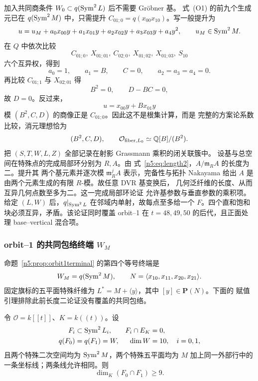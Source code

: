 加入共同商条件 \(W_0\subset q(\operatorname{Sym}^2L)\) 后不需要 Gröbner 基。
式~(O1) 的前九个生成元已在 \(q(\operatorname{Sym}^2M)\) 中，只需提升
\(C_{01;0}=q(x_{00}x_{10})\)。写一般提升为
\[
u=u_M+a_0x_{00}y+a_1x_{01}y+a_2x_{02}y+a_3x_{03}y+a_4y^2,
\qquad u_M\in\operatorname{Sym}^2M .
\]
在 \(Q\) 中依次比较
\[
C_{01;0},\ X_{01;01},\ C_{02;0},\ X_{01;02},\
X_{01;03},\ S_{10}
\]
六个互异权，得到
\[
a_0=1,\qquad a_1=B,\qquad C=0,\qquad
a_2=a_3=a_4=0.
\]
再比较 \(C_{01;1}\) 与 \(X_{02;01}\) 得
\[
B^2=0,\qquad D-BC=0,
\]
故 \(D=0\)。反过来，
\[
u=x_{00}y+Bx_{01}y
\]
模 \((B^2,C,D)\) 的商像正是 \(C_{01;0}\)。因此这不是根集计算，而是
完整的方案论系数比较，消元理想恰为
\begin{equation}\label{n5:eq:length2}
 (B^2,C,D),\qquad
 \mathcal O_{\mathrm{fiber},L_0}\simeq\mathbb Q[B]/(B^2).
\end{equation}
把 \((S,T,W,L,Z)\) 全部记录在射影 Grassmann 乘积的闭关联簇中。
设基与总空间在特殊点的完成局部环分别为 \(R,A\)。由
式~\eqref{n5:eq:length2}，\(A/\mathfrak m_RA\) 的长度为二。提升其
两个基元素并逐次模 \(\mathfrak m_R^jA\) 表示，完备性与拓扑 Nakayama
给出 \(A\) 是由两个元素生成的有限 \(R\)-模。故任意 DVR 基变换后，
几何泛纤维的长度、从而互异几何点数至多为二。这一完成局部环论证
允许基参数与垂直参数的乘积项。
给定 \((L,W)\) 后，\(q|_{\operatorname{Sym}^2L}\) 在邻域内单射，故每点至多给一个
\(F\)。四个直和饱和块必须互异，矛盾。该论证同时覆盖 orbit--1 在
\(t=48,49,50\) 的后代，且正面处理 base--vertical 混合项。

\subsubsection{orbit--1 的共同包络终端 \(W_M\)}

命题~\ref{n5:prop:orbit1terminal} 的第四个等号终端是
\[
 W_M=q(\operatorname{Sym}^2M),\qquad
 N=\langle x_{10},x_{11},x_{20},x_{21}\rangle .
\]
固定旗标的五平面特殊纤维为
\(L^*=M+\langle y\rangle\)，其中 \([y]\in\mathbf P(N)\)。下面的
赋值引理排除此前长度二论证没有覆盖的共同包络。

\begin{lemma}[同行全阶碰撞]
\label{n5:lem:samerow}
令 \(\mathcal O=k[[t]]\)、\(K=k((t))\)。设
\[
\begin{aligned}
 F_i&\subset\operatorname{Sym}^2L_i,& F_i\cap E_K&=0,\\
 q(F_0)&=q(F_1)=W,& \dim W&=10,\quad i=0,1,
\end{aligned}
\]
且两个特殊二次空间均为 \(\operatorname{Sym}^2M\)，两个特殊五平面均为
\(M\) 加上同一外部行中的一条坐标线；两条线允许相同。则
\[
 \dim_K(F_0\cap F_1)\ge9.
\]
\end{lemma}

